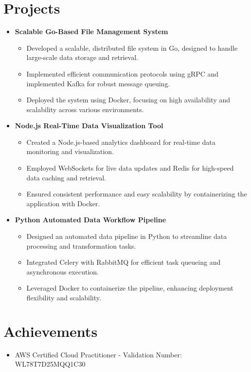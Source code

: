 \documentclass[letterpaper,11pt]{article}
\newcommand{\resumeItem}[1]{
  \item\small{
    {#1 \vspace{-2pt}}
  }
}
\newcommand{\resumeSubItem}[1]{\resumeItem{#1}\vspace{-4pt}}
\newcommand{\resumeSubHeadingListStart}{\begin{itemize}[leftmargin=0.15in, label={$\bullet$}]}
\newcommand{\resumeSubHeadingListEnd}{\end{itemize}}
\newcommand{\resumeItemListStart}{\begin{itemize}[label={$\bullet$}]}
\newcommand{\resumeItemListEnd}{\end{itemize}\vspace{-5pt}}
\begin{document}
\section{Projects}
    \resumeSubHeadingListStart
      \resumeSubItem{\textbf{Scalable Go-Based File Management System}}
        \resumeItemListStart
          \resumeItem{Developed a scalable, distributed file system in Go, designed to handle large-scale data storage and retrieval.}
          \resumeItem{Implemented efficient communication protocols using gRPC and implemented Kafka for robust message queuing.}
          \resumeItem{Deployed the system using Docker, focusing on high availability and scalability across various environments.}
        \resumeItemListEnd
      \resumeSubItem{\textbf{Node.js Real-Time Data Visualization Tool}}
        \resumeItemListStart
          \resumeItem{Created a Node.js-based analytics dashboard for real-time data monitoring and visualization.}
          \resumeItem{Employed WebSockets for live data updates and Redis for high-speed data caching and retrieval.}
          \resumeItem{Ensured consistent performance and easy scalability by containerizing the application with Docker.}
        \resumeItemListEnd
      \resumeSubItem{\textbf{Python Automated Data Workflow Pipeline}}
        \resumeItemListStart
          \resumeItem{Designed an automated data pipeline in Python to streamline data processing and transformation tasks.}
          \resumeItem{Integrated Celery with RabbitMQ for efficient task queueing and asynchronous execution.}
          \resumeItem{Leveraged Docker to containerize the pipeline, enhancing deployment flexibility and scalability.}
        \resumeItemListEnd
    \resumeSubHeadingListEnd

\section{Achievements}
    \resumeSubHeadingListStart
      \resumeItem{AWS Certified Cloud Practitioner - Validation Number: WL78T7D25MQQ1C30}
    \resumeSubHeadingListEnd
\end{document}
